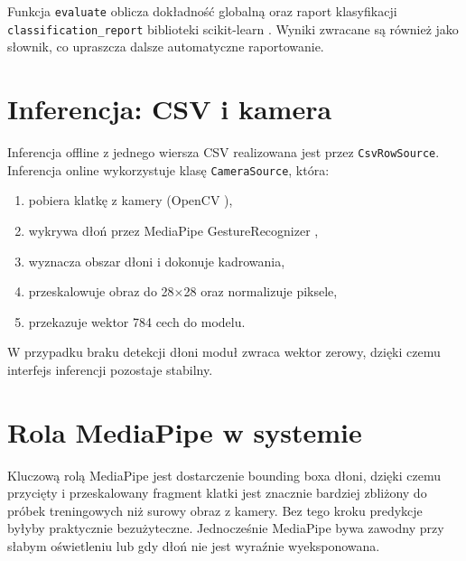 Funkcja \texttt{evaluate} oblicza dokładność globalną oraz raport klasyfikacji
\texttt{classification\_report} biblioteki scikit-learn \cite{sklearn_docs}.
Wyniki zwracane są również jako słownik, co upraszcza dalsze automatyczne
raportowanie.

\section{Inferencja: CSV i kamera}
\label{sec:inferencja_csv_kamera}

Inferencja offline z jednego wiersza CSV realizowana jest przez
\texttt{CsvRowSource}. Inferencja online wykorzystuje klasę \texttt{CameraSource},
która:
\begin{enumerate}
    \item pobiera klatkę z kamery (OpenCV \cite{opencv_docs}),
    \item wykrywa dłoń przez MediaPipe GestureRecognizer \cite{mediapipe_docs},
    \item wyznacza obszar dłoni i dokonuje kadrowania,
    \item przeskalowuje obraz do 28$\times$28 oraz normalizuje piksele,
    \item przekazuje wektor 784 cech do modelu.
\end{enumerate}

W przypadku braku detekcji dłoni moduł zwraca wektor zerowy, dzięki czemu
interfejs inferencji pozostaje stabilny.

\section{Rola MediaPipe w systemie}

Kluczową rolą MediaPipe jest dostarczenie bounding boxa dłoni, dzięki czemu
przycięty i przeskalowany fragment klatki jest znacznie bardziej zbliżony
do próbek treningowych niż surowy obraz z kamery. Bez tego kroku predykcje
byłyby praktycznie bezużyteczne. Jednocześnie MediaPipe bywa zawodny
przy słabym oświetleniu lub gdy dłoń nie jest wyraźnie wyeksponowana.